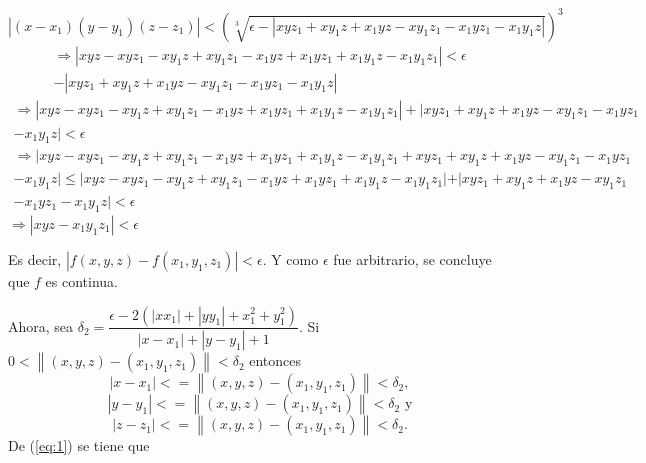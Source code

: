 \documentclass[fleqn]{article}
\begin{document}
\begin{enumerate}
        $ \left\lvert (x - x_1)(y - y_1)(z - z_1) \right\rvert < \displaystyle \left(\sqrt[3]{\epsilon - \left \lvert xyz_1 + xy_1z + x_1yz - xy_1z_1 - x_1yz_1 - x_1y_1z \right \rvert} \right)^3 $
        \begin{multline*}
            \Longrightarrow \left\lvert xyz - xyz_1 - xy_1z + xy_1z_1 - x_1yz + x_1yz_1 + x_1y_1z - x_1y_1z_1 \right\rvert < \epsilon \\
            - |xyz_1 + xy_1z + x_1yz - xy_1z_1 - x_1yz_1 - x_1y_1z|
        \end{multline*}
        \begin{multline*}
            \Longrightarrow |xyz - xyz_1 - xy_1z + xy_1z_1 - x_1yz + x_1yz_1 + x_1y_1z - x_1y_1z_1| + |xyz_1 + xy_1z + x_1yz - xy_1z_1 - x_1yz_1 \\
            - x_1y_1z| < \epsilon
        \end{multline*}
        \begin{multline*}
            \Longrightarrow |xyz - xyz_1 - xy_1z + xy_1z_1 - x_1yz + x_1yz_1 + x_1y_1z - x_1y_1z_1 + xyz_1 + xy_1z + x_1yz - xy_1z_1 - x_1yz_1 \\
            - x_1y_1z| \leq |xyz - xyz_1 - xy_1z + xy_1z_1 - x_1yz + x_1yz_1 + x_1y_1z - x_1y_1z_1| + |xyz_1 + xy_1z + x_1yz - xy_1z_1 \\ 
            - x_1yz_1 - x_1y_1z| < \epsilon
        \end{multline*}
        \hspace{9mm} $ \Longrightarrow |xyz - x_1y_1z_1| < \epsilon $

        Es decir, $ \left\lvert f(x,y,z) - f(x_1,y_1,z_1) \right\rvert < \epsilon $. Y como $ \epsilon $ fue arbitrario, se concluye que $ f $ es continua.

        Ahora, sea $ \delta_2 = \dfrac{\epsilon - 2(\left\lvert xx_1 \right\rvert + \left\lvert yy_1 \right\rvert + x_1^2 + y_1^2)}{\left\lvert x - x_1 \right\rvert + \left\lvert y - y_1 \right\rvert + 1} $. Si $ 0 < \left\lVert (x,y,z) - (x_1,y_1,z_1) \right\rVert < \delta_2 $ entonces
        \begin{equation}
            \left\lvert x - x_1 \right\rvert <= \left\lVert (x,y,z) - (x_1,y_1,z_1) \right\rVert < \delta_2,
            \label{eq:1}
        \end{equation}
        \begin{equation}
            \left\lvert y - y_1 \right\rvert <= \left\lVert (x,y,z) - (x_1,y_1,z_1) \right\rVert < \delta_2 \text{ y}
            \label{eq:2}
        \end{equation}
        \begin{equation}
            \left\lvert z - z_1 \right\rvert <= \left\lVert (x,y,z) - (x_1,y_1,z_1) \right\rVert < \delta_2.
            \label{eq:3}
        \end{equation}
        De (\ref{eq:1}) se tiene que


\end{enumerate}
\end{document}
